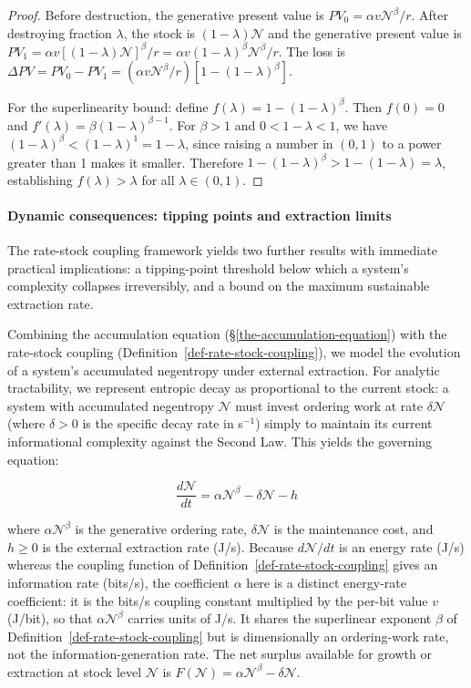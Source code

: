 \documentclass[11pt]{article}
\theoremstyle{plain}
\theoremstyle{definition}
\theoremstyle{remark}
\let\origparagraphcmd\paragraph
\renewcommand{\paragraph}{\needspace{3\baselineskip}\origparagraphcmd}
\begin{document}
\begin{proof}
Before destruction, the generative present value is $PV_0 = \alpha v \mathcal{N}^\beta / r$. After destroying fraction $\lambda$, the stock is $(1-\lambda)\mathcal{N}$ and the generative present value is $PV_1 = \alpha v [(1-\lambda)\mathcal{N}]^\beta / r = \alpha v (1-\lambda)^\beta \mathcal{N}^\beta / r$. The loss is $\Delta PV = PV_0 - PV_1 = (\alpha v \mathcal{N}^\beta / r)[1 - (1-\lambda)^\beta]$.

For the superlinearity bound: define $f(\lambda) = 1 - (1-\lambda)^\beta$. Then $f(0) = 0$ and $f'(\lambda) = \beta(1-\lambda)^{\beta-1}$. For $\beta > 1$ and $0 < 1-\lambda < 1$, we have $(1-\lambda)^\beta < (1-\lambda)^1 = 1-\lambda$, since raising a number in $(0,1)$ to a power greater than 1 makes it smaller. Therefore $1-(1-\lambda)^\beta > 1-(1-\lambda) = \lambda$, establishing $f(\lambda) > \lambda$ for all $\lambda \in (0,1)$.
\end{proof}

\paragraph{Dynamic consequences: tipping points and extraction
limits}\label{dynamic-consequences-tipping-points-and-extraction-limits}

The rate-stock coupling framework yields two further results with
immediate practical implications: a tipping-point threshold below which
a system's complexity collapses irreversibly, and a bound on the maximum
sustainable extraction rate.

Combining the accumulation equation (§\ref{the-accumulation-equation})
with the rate-stock coupling (Definition~\ref{def-rate-stock-coupling}),
we model the evolution of a system's accumulated negentropy under
external extraction. For analytic tractability, we represent entropic
decay as proportional to the current stock: a system with accumulated
negentropy \(\mathcal{N}\) must invest ordering work at rate
\(\delta\mathcal{N}\) (where \(\delta > 0\) is the specific decay rate
in s\(^{-1}\)) simply to maintain its current informational complexity
against the Second Law. This yields the governing equation:

\[\frac{d\mathcal{N}}{dt} = \alpha\mathcal{N}^\beta - \delta\mathcal{N} - h\]

where \(\alpha\mathcal{N}^\beta\) is the generative ordering rate,
\(\delta\mathcal{N}\) is the maintenance cost, and \(h \geq 0\) is the
external extraction rate (J/s). Because \(d\mathcal{N}/dt\) is an energy
rate (J/s) whereas the coupling function of
Definition~\ref{def-rate-stock-coupling} gives an information rate
(bits/s), the coefficient \(\alpha\) here is a distinct energy-rate
coefficient: it is the bits/s coupling constant multiplied by the
per-bit value \(v\) (J/bit), so that \(\alpha\mathcal{N}^\beta\) carries
units of J/s. It shares the superlinear exponent \(\beta\) of
Definition~\ref{def-rate-stock-coupling} but is dimensionally an
ordering-work rate, not the information-generation rate. The net surplus
available for growth or extraction at stock level \(\mathcal{N}\) is
\(F(\mathcal{N}) = \alpha\mathcal{N}^\beta - \delta\mathcal{N}\).
\end{document}
